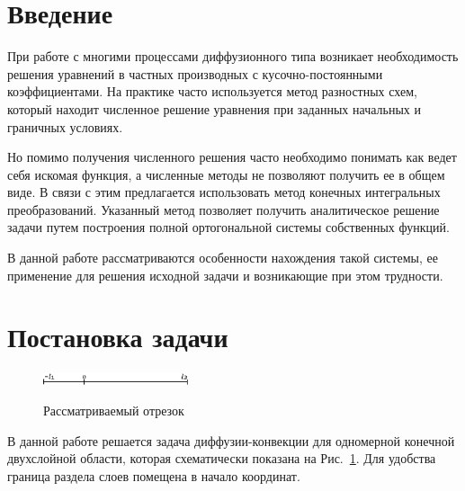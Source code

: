 \documentclass[12pt, a4paper, draft]{article}
\begin{document}
\section{Введение}
При работе с многими процессами диффузионного типа возникает необходимость решения уравнений
в частных производных с кусочно-постоянными коэффициентами.
На практике часто используется метод разностных схем, который находит численное решение уравнения при
заданных начальных и граничных условиях.

Но помимо получения численного решения часто необходимо понимать как ведет себя искомая функция, а численные методы не позволяют получить ее в общем виде.
В связи с этим предлагается использовать метод конечных интегральных преобразований.
Указанный метод позволяет получить аналитическое решение задачи путем построения полной ортогональной
системы собственных функций.

В данной работе рассматриваются особенности нахождения такой системы, ее применение для решения исходной задачи
и возникающие при этом трудности.

\section{Постановка задачи}
\begin{figure}
  \centering
  \label{fig:1}
  \includegraphics[width=0.38\textwidth]{fig1.eps}
  \\
  \caption{Рассматриваемый отрезок}
\end{figure}
В данной работе решается задача диффузии-конвекции для одномерной конечной двухслойной области, которая схематически показана на Рис.~\ref{fig:1}. Для удобства граница раздела слоев помещена в начало координат.
\end{document}
